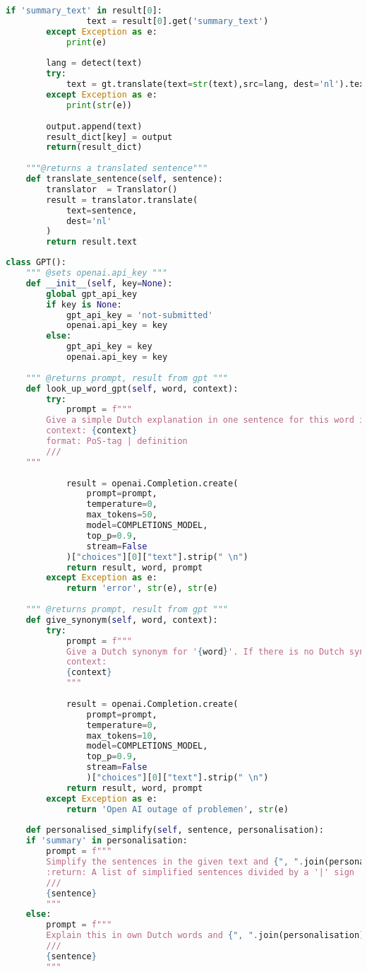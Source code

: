 \begin{lstlisting}[language=Python, caption={HuggingFace-klasse}, label={code:huggingface-klasse}]
			if 'summary_text' in result[0]:
				text = result[0].get('summary_text')
		except Exception as e:
			print(e)
	
		lang = detect(text)
		try:
			text = gt.translate(text=str(text),src=lang, dest='nl').text 
		except Exception as e:
			print(str(e))
		
		output.append(text)
		result_dict[key] = output
		return(result_dict)            
	
	"""@returns a translated sentence"""
	def translate_sentence(self, sentence):
		translator  = Translator()
		result = translator.translate(
			text=sentence,
			dest='nl'
		)
		return result.text
\end{lstlisting}

\begin{lstlisting}[language=Python, caption={De gebruikte Python-klasse voor gepersonaliseerde ATS}, label={listing:gpt-class}]
class GPT():
	""" @sets openai.api_key """
	def __init__(self, key=None):
		global gpt_api_key
		if key is None:
			gpt_api_key = 'not-submitted'
			openai.api_key = key
		else:
			gpt_api_key = key
			openai.api_key = key
	
	""" @returns prompt, result from gpt """
	def look_up_word_gpt(self, word, context):
		try:
			prompt = f"""
		Give a simple Dutch explanation in one sentence for this word in the given context. Give the PoS-tag and Dutch definition: '{word}'
		context: {context}
		format: PoS-tag | definition
		///
	"""
	
			result = openai.Completion.create(
				prompt=prompt,
				temperature=0,
				max_tokens=50,
				model=COMPLETIONS_MODEL,
				top_p=0.9,
				stream=False
			)["choices"][0]["text"].strip(" \n")    
			return result, word, prompt	
		except Exception as e:
			return 'error', str(e), str(e)
	
	""" @returns prompt, result from gpt """
	def give_synonym(self, word, context):
		try:
			prompt = f"""
			Give a Dutch synonym for '{word}'. If there is no Dutch synonym available, explain it between curly brackets.
			context:
			{context}
			"""
			
			result = openai.Completion.create(
				prompt=prompt,
				temperature=0,
				max_tokens=10,
				model=COMPLETIONS_MODEL,
				top_p=0.9,
				stream=False
				)["choices"][0]["text"].strip(" \n")    
			return result, word, prompt
		except Exception as e:
			return 'Open AI outage of problemen', str(e)
		
	def personalised_simplify(self, sentence, personalisation):
	if 'summary' in personalisation:
		prompt = f"""
		Simplify the sentences in the given text and {", ".join(personalisation)}
		:return: A list of simplified sentences divided by a '|' sign
		///
		{sentence}
		"""
	else:
		prompt = f"""
		Explain this in own Dutch words and {", ".join(personalisation)}
		///
		{sentence}
		"""
	

\end{lstlisting}
